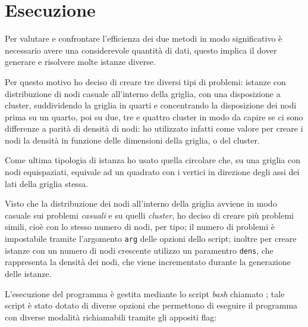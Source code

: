 \section{Esecuzione}
Per valutare e confrontare l'efficienza dei due metodi in modo significativo è necessario avere una considerevole quantità di dati, questo implica il dover generare e risolvere molte istanze diverse.

Per questo motivo ho deciso di creare tre diversi tipi di problemi: istanze con distribuzione di nodi casuale all'interno della griglia, con una disposizione a cluster, suddividendo la griglia in quarti e concentrando la disposizione dei nodi prima su un quarto, poi su due, tre e quattro cluster in modo da capire se ci sono differenze a parità di densità di nodi: ho utilizzato infatti come valore per creare i nodi la densità in funzione delle dimensioni della griglia, o del cluster.

Come ultima tipologia di istanza ho usato quella circolare che, su una griglia con nodi equispaziati, equivale ad un quadrato con i vertici in direzione degli assi dei lati della griglia stessa.

Visto che la distribuzione dei nodi all'interno della griglia avviene in modo casuale sui problemi \emph{casuali} e su quelli \emph{cluster}, ho deciso di creare più problemi simili, cioè con lo stesso numero di nodi, per tipo; il numero di problemi è impostabile tramite l'argomento \texttt{arg} delle opzioni dello script; inoltre per creare istanze con un numero di nodi crescente utilizzo un paramentro \texttt{dens}, che rappresenta la densità dei nodi, che viene incrementato durante la generazione delle istanze.

L'esecuzione del programma è gestita mediante lo script \emph{bash} chiamato ; tale script è stato dotato di diverse opzioni che permettono di eseguire il programma con diverse modalità richiamabili tramite gli appositi flag:

